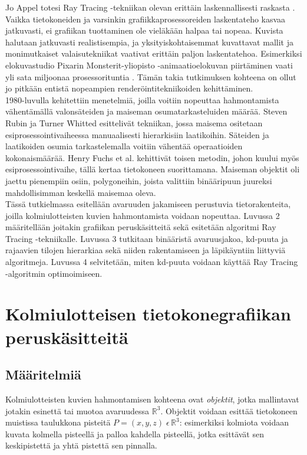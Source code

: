 \documentclass[a4paper, 12pt, titlepage]{article}
\newcommand{\R}{\mathbb{R}}
\begin{document}
Jo Appel totesi Ray Tracing -tekniikan olevan erittäin laskennallisesti raskasta \citep{appel}. Vaikka tietokoneiden ja varsinkin grafiikkaprosessoreiden laskentateho kasvaa jatkuvasti, ei grafiikan tuottaminen ole vieläkään halpaa tai nopeaa. Kuvista halutaan jatkuvasti realistisempia, ja yksityiskohtaisemmat kuvattavat mallit ja monimutkaiset valaisutekniikat vaativat erittäin paljon laskentatehoa. Esimerkiksi elokuvastudio Pixarin Monsterit-yliopisto -animaatioelokuvan piirtäminen vaati yli sata miljoonaa prosessorituntia \citep{monsterit}. Tämän takia tutkimuksen kohteena on ollut jo pitkään entistä nopeampien renderöintitekniikoiden kehittäminen.\\

1980-luvulla kehitettiin menetelmiä, joilla voitiin nopeuttaa hahmontamista vähentämällä valonsäteiden ja maiseman osumatarkasteluiden määrää. Steven Rubin ja Turner Whitted esittelivät tekniikan, jossa maisema ositetaan esiprosessointivaiheessa manuaalisesti hierarkisiin laatikoihin. Säteiden ja laatikoiden osumia tarkastelemalla voitiin vähentää operaatioiden kokonaismäärää. \citep[.]{rubin} Henry Fuchs et al. kehittivät toisen metodin, johon kuului myös esiprosessointivaihe, tällä kertaa tietokoneen suorittamana. Maiseman objektit oli jaettu pienempiin osiin, polygoneihin, joista valittiin binääripuun juureksi mahdollisimman keskellä maisemaa oleva.\\

Tässä tutkielmassa esitellään avaruuden jakamiseen perustuvia tietorakenteita, joilla kolmiulotteisten kuvien hahmontamista voidaan nopeuttaa. Luvussa 2 määritellään joitakin grafiikan peruskäsitteitä sekä esitetään algoritmi Ray Tracing -tekniikalle. Luvussa 3 tutkitaan binääristä avaruusjakoa, kd-puuta ja rajaavien tilojen hierarkiaa sekä niiden rakentamiseen ja läpikäyntiin liittyviä algoritmeja. Luvussa 4 selvitetään, miten kd-puuta voidaan käyttää Ray Tracing -algoritmin optimoimiseen.


\newpage
\section{Kolmiulotteisen tietokonegrafiikan peruskäsitteitä}
\subsection{Määritelmiä}

Kolmiulotteisten kuvien hahmontamisen kohteena ovat \emph{objektit}, jotka mallintavat jotakin esinettä tai muotoa avaruudessa $\R^3$. Objektit voidaan esittää tietokoneen muistissa taulukkona pisteitä $P=(x,y,z)\;\epsilon\,\R^3$: esimerkiksi kolmiota voidaan kuvata kolmella pisteellä ja palloa kahdella pisteellä, jotka esittävät sen keskipistettä ja yhtä pistettä sen pinnalla. \citep[.]{angel}\\
\end{document}
